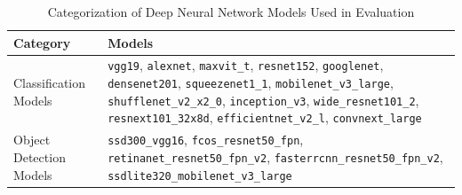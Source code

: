 \begin{table}[h]
	\centering \caption{Categorization of Deep Neural Network Models Used in Evaluation} \label{tab:dnn-models}
	\begin{tabular}{p{4cm}p{6cm}}
		\hline
		\textbf{Category} & \textbf{Models}
		\\ \hline
		Classification Models &
		\texttt{vgg19},
		\texttt{alexnet},
		\texttt{maxvit\_t},
		\texttt{resnet152},
		\texttt{googlenet},
		\texttt{densenet201},
		\texttt{squeezenet1\_1},
		\texttt{mobilenet\_v3\_large},
		\texttt{shufflenet\_v2\_x2\_0},
		\texttt{inception\_v3},
		\texttt{wide\_resnet101\_2},
		\texttt{resnext101\_32x8d},
		\texttt{efficientnet\_v2\_l},
		\texttt{convnext\_large}
		\\ \hline
		Object Detection Models &
		\texttt{ssd300\_vgg16},
		\texttt{fcos\_resnet50\_fpn},
		\texttt{retinanet\_resnet50\_fpn\_v2},
		\texttt{fasterrcnn\_resnet50\_fpn\_v2},
		\texttt{ssdlite320\_mobilenet\_v3\_large}
		\\ \hline 
	\end{tabular}
\end{table}



